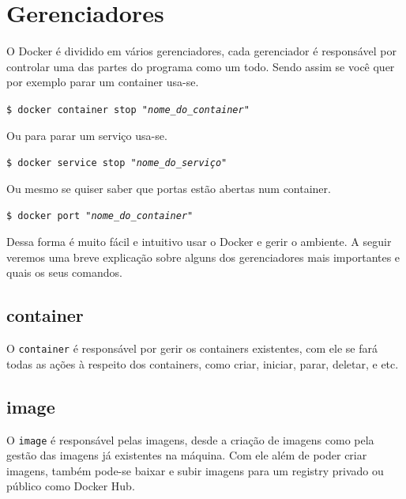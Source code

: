 \documentclass[twocolumn, letterpaper]{scrartcl}
\begin{document}
\section*{\color{triton_blue}Gerenciadores}
O Docker é dividido em vários gerenciadores, cada gerenciador é responsável por controlar uma das partes do programa como um todo. Sendo assim se você quer por exemplo parar um container usa-se.
\begin{center}
    \texttt{\$ docker container stop \textit{"nome\_do\_container"}}
\end{center}
Ou para parar um serviço usa-se.
\begin{center}
    \texttt{\$ docker service stop \textit{"nome\_do\_serviço"}}
\end{center}
Ou mesmo se quiser saber que portas estão abertas num container.
\begin{center}
    \texttt{\$ docker port \textit{"nome\_do\_container"}}
\end{center}
Dessa forma é muito fácil e intuitivo usar o Docker e gerir o ambiente. A seguir veremos uma breve explicação sobre alguns dos gerenciadores mais importantes e quais os seus comandos.

\subsection*{\color{triton_blue}container}
O \texttt{container} é responsável por gerir os containers existentes, com ele se fará todas as ações à respeito dos containers, como criar, iniciar, parar, deletar, e etc.\\
\indent{}
\subsection*{\color{triton_blue}image}
O \texttt{image} é responsável pelas imagens, desde a criação de imagens como pela gestão das imagens já existentes na máquina. Com ele além de poder criar imagens, também pode-se baixar e subir imagens para um registry privado ou público como Docker Hub.\\
\indent{}
\end{document}
